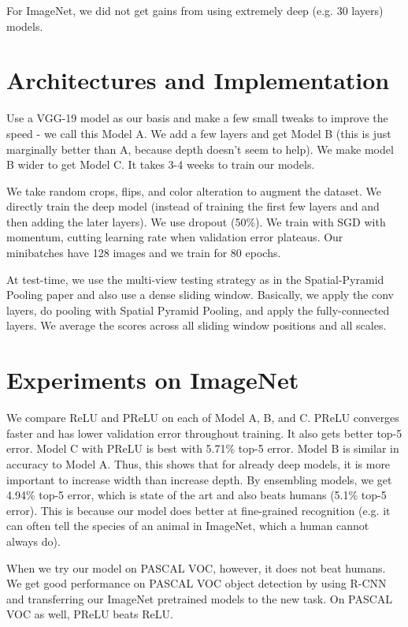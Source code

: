 \documentclass[a4paper]{article}
\begin{document}
For ImageNet, we did not get gains from using extremely deep (e.g. 30 layers)
models.

\section{Architectures and Implementation}
Use a VGG-19 model as our basis and make a few small tweaks to improve the
speed - we call this Model A. We add a few layers and get Model B (this is
just marginally better than A, because depth doesn't seem to help). We make
model B wider to get Model C. It takes 3-4 weeks to train our models.

We take random crops, flips, and color alteration to augment the dataset. We
directly train the deep model (instead of training the first few layers and
and then adding the later layers). We use dropout (50\%). We train with SGD
with momentum, cutting learning rate when validation error plateaus. Our
minibatches have 128 images and we train for 80 epochs.

At test-time, we use the multi-view testing strategy as in the Spatial-Pyramid
Pooling paper and also use a dense sliding window. Basically, we apply the
conv layers, do pooling with Spatial Pyramid Pooling, and apply the
fully-connected layers. We average the scores across all sliding window
positions and all scales.

\section{Experiments on ImageNet}
We compare ReLU and PReLU on each of Model A, B, and C. PReLU converges faster
and has lower validation error throughout training. It also gets better
top-5 error. Model C with PReLU is best with 5.71\% top-5 error. Model B
is similar in accuracy to Model A. Thus, this shows that for already deep
models, it is more important to increase width than increase depth. By
ensembling models, we get 4.94\% top-5 error, which is state of the art and
also beats humans (5.1\% top-5 error). This is because our model does better at
fine-grained recognition (e.g. it can often
tell the species of an animal in ImageNet, which a human cannot always do).

When we try our model on PASCAL VOC, however, it does not beat humans. We get
good performance on PASCAL VOC object detection by using R-CNN and transferring
our ImageNet pretrained models to the new task. On PASCAL VOC as well, PReLU
beats ReLU.
\end{document}
